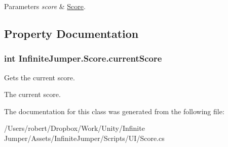 \begin{DoxyParams}{Parameters}
{\em score} & \hyperlink{class_infinite_jumper_1_1_score}{Score}.\\
\hline
\end{DoxyParams}


\subsection{Property Documentation}
\hypertarget{class_infinite_jumper_1_1_score_aa9f2d756b3a3688323a8faf10d78a3c7}{}
\subsubsection[{current\+Score}]{\setlength{\rightskip}{0pt plus 5cm}int Infinite\+Jumper.\+Score.\+current\+Score\hspace{0.3cm}{\ttfamily [get]}}\label{class_infinite_jumper_1_1_score_aa9f2d756b3a3688323a8faf10d78a3c7}


Gets the current score. 

The current score.

The documentation for this class was generated from the following file\+:\begin{DoxyCompactItemize}
\item 
/\+Users/robert/\+Dropbox/\+Work/\+Unity/\+Infinite Jumper/\+Assets/\+Infinite\+Jumper/\+Scripts/\+U\+I/Score.\+cs\end{DoxyCompactItemize}
